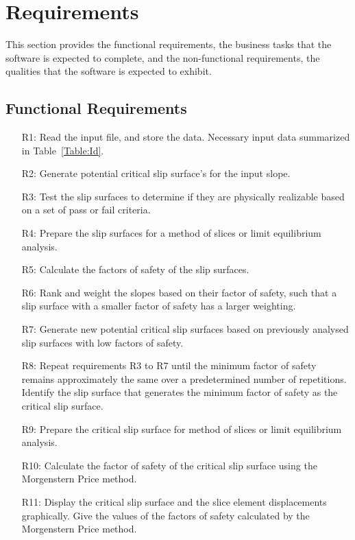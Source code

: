 \documentclass[12pt]{article}
\begin{document}
\section{Requirements}
\label{Sec:R}
This section provides the functional requirements, the business tasks that the software is expected to complete, and the non-functional requirements, the qualities that the software is expected to exhibit.
\subsection{Functional Requirements}
\label{Sec:FR}
\begin{itemize}
\item[R1:]Read the input file, and store the data. Necessary input data summarized in Table~\ref{Table:Id}.
\item[R2:]Generate potential critical slip surface's for the input slope.
\item[R3:]Test the slip surfaces to determine if they are physically realizable based on a set of pass or fail criteria.
\item[R4:]Prepare the slip surfaces for a method of slices or limit equilibrium analysis.
\item[R5:]Calculate the factors of safety of the slip surfaces.
\item[R6:]Rank and weight the slopes based on their factor of safety, such that a slip surface with a smaller factor of safety has a larger weighting.
\item[R7:]Generate new potential critical slip surfaces based on previously analysed slip surfaces with low factors of safety.
\item[R8:]Repeat requirements R3 to R7 until the minimum factor of safety remains approximately the same over a predetermined number of repetitions. Identify the slip surface that generates the minimum factor of safety as the critical slip surface.
\item[R9:]Prepare the critical slip surface for method of slices or limit equilibrium analysis.
\item[R10:]Calculate the factor of safety of the critical slip surface using the Morgenstern Price method.
\item[R11:]Display the critical slip surface and the slice element displacements graphically. Give the values of the factors of safety calculated by the Morgenstern Price method.
\end{itemize}
\end{document}
